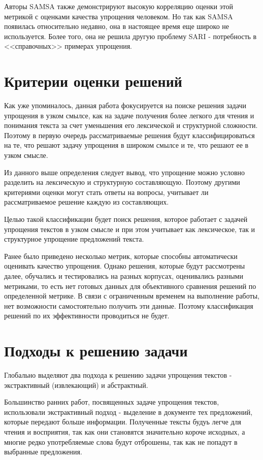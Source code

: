 Авторы SAMSA также демонстрируют высокую корреляцию оценки этой метрикой с оценками качества упрощения человеком. Но так как SAMSA появилась относительно недавно, она в настоящее время еще широко не используется. Более того, она не решила другую проблему SARI - потребность в <<справочных>> примерах упрощения.


\section{Критерии оценки решений}

Как уже упоминалось, данная работа фокусируется на поиске решения задачи упрощения в узком смылсе, как на задаче получения более легкого для чтения и понимания текста за счет уменьшения его лексической и структурной сложности\cite{martin_muss_2021}. Поэтому в первую очередь рассматриваемые решения будут классифицироваться на те, что решают задачу упрощения в широком смылсе и те, что решают ее в узком смысле.

Из данного выше определения следует вывод, что упрощение можно условно разделить на лексическую и структурную составляющую. Поэтому другими критериями оценки могут стать ответы на вопросы, учитывает ли рассматриваемое решение каждую из составляющих.

Целью такой классификации будет поиск решения, которое работает с задачей упрощения текстов в узком смысле и при этом учитывает как лексическое, так и структурное упрощение предложений текста.

Ранее было приведено несколько метрик, которые способны автоматически оценивать качество упрощения. Однако решения, которые будут рассмотрены далее, обучались и тестировались на разных корпусах, оценивались разными метриками, то есть нет готовых данных для объективного сравнения решений по определенной метрике. В связи с ограниченным временем на выполнение работы, нет возможности самостоятельно получить эти данные. Поэтому классификация решений по их эффективности проводиться не будет.


\section{Подходы к решению задачи}

Глобально выделяют два подхода к решению задачи упрощения текстов - экстрактивный (извлекающий) и абстрактный.

Большинство ранних работ, посвященных задаче упрощения текстов, использовали экстрактивный подход - выделение в документе тех предложений, которые передают больше информации. Полученные тексты будуь легче для чтения и восприятия, так как они становятся значительно короче исходных, а многие редко употребляемые слова будут отброшены, так как не попадут в выбранные предложения. 

